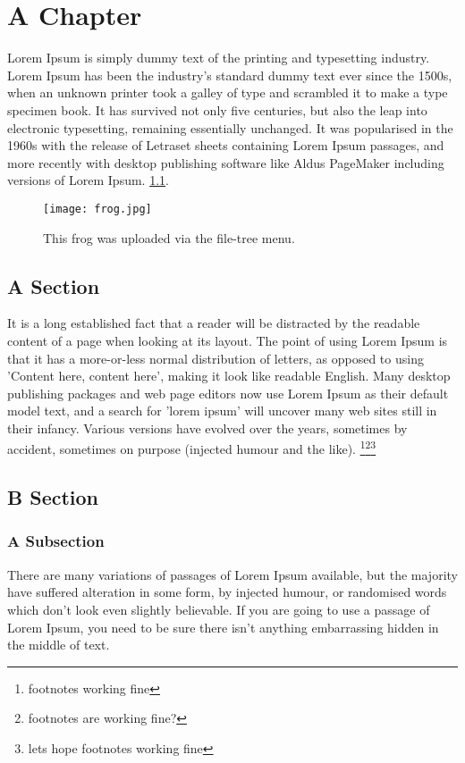 \chapter{A Chapter}

Lorem Ipsum is simply dummy text of the printing and typesetting industry. Lorem Ipsum has been the industry's standard dummy text ever since the 1500s, when an unknown printer took a galley of type and scrambled it to make a type specimen book. It has survived not only five centuries, but also the leap into electronic typesetting, remaining essentially unchanged. It was popularised in the 1960s with the release of Letraset sheets containing Lorem Ipsum passages, and more recently with desktop publishing software like Aldus PageMaker including versions of Lorem Ipsum. \ref{fig:frog}.

\begin{figure}[!htbp]
    \centering
    \texttt{[image: frog.jpg]}
    \caption{\label{fig:frog}This frog was uploaded via the file-tree menu.}
\end{figure}

\section{A Section}

It is a long established fact that a reader will be distracted by the readable content of a page when looking at its layout. The point of using Lorem Ipsum is that it has a more-or-less normal distribution of letters, as opposed to using 'Content here, content here', making it look like readable English. Many desktop publishing packages and web page editors now use Lorem Ipsum as their default model text, and a search for 'lorem ipsum' will uncover many web sites still in their infancy. Various versions have evolved over the years, sometimes by accident, sometimes on purpose (injected humour and the like). \footnote{footnotes working fine}\footnote{footnotes are working fine?}\footnote{lets hope footnotes working fine}

\section{B Section}

\subsection{A Subsection}
There are many variations of passages of Lorem Ipsum available, but the majority have suffered alteration in some form, by injected humour, or randomised words which don't look even slightly believable. If you are going to use a passage of Lorem Ipsum, you need to be sure there isn't anything embarrassing hidden in the middle of text. 

